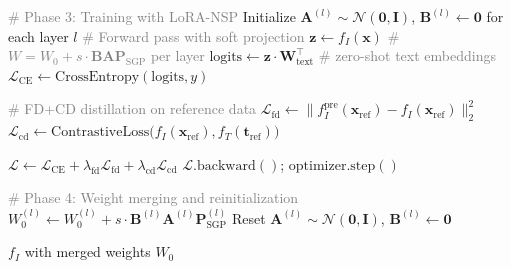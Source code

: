 \documentclass{article}
\begin{document}
\begin{algorithm}[h]
\begin{algorithmic}[1]
    \State \textcolor{gray}{\# Phase 3: Training with LoRA-NSP}
    \State Initialize $\mathbf{A}^{(l)} \sim \mathcal{N}(\mathbf{0}, \mathbf{I})$, $\mathbf{B}^{(l)} \leftarrow \mathbf{0}$ for each layer $l$
            \State \textcolor{gray}{\# Forward pass with soft projection}
            \State $\mathbf{z} \leftarrow f_I(\mathbf{x})$ \textcolor{gray}{\# $W = W_0 + s \cdot \mathbf{B} \mathbf{A} \mathbf{P}_{\text{SGP}}$ per layer}
            \State $\text{logits} \leftarrow \mathbf{z} \cdot \mathbf{W}_{\text{text}}^\top$ \textcolor{gray}{\# zero-shot text embeddings}
            \State $\mathcal{L}_{\text{CE}} \leftarrow \text{CrossEntropy}(\text{logits}, y)$
            
            \State \textcolor{gray}{\# FD+CD distillation on reference data}
            \State $\mathcal{L}_{\text{fd}} \leftarrow \|f_I^{\text{pre}}(\mathbf{x}_{\text{ref}}) - f_I(\mathbf{x}_{\text{ref}})\|_2^2$
            \State $\mathcal{L}_{\text{cd}} \leftarrow \text{ContrastiveLoss}\big(f_I(\mathbf{x}_{\text{ref}}), f_T(\mathbf{t}_{\text{ref}})\big)$
            
            \State $\mathcal{L} \leftarrow \mathcal{L}_{\text{CE}} + \lambda_{\text{fd}} \mathcal{L}_{\text{fd}} + \lambda_{\text{cd}} \mathcal{L}_{\text{cd}}$
            \State $\mathcal{L}.\text{backward}()$; $\text{optimizer}.\text{step}()$
        \EndFor
    \EndFor

    \State \textcolor{gray}{\# Phase 4: Weight merging and reinitialization}
        \State $W_0^{(l)} \leftarrow W_0^{(l)} + s \cdot \mathbf{B}^{(l)} \mathbf{A}^{(l)} \mathbf{P}_{\text{SGP}}^{(l)}$
        \State Reset $\mathbf{A}^{(l)} \sim \mathcal{N}(\mathbf{0}, \mathbf{I})$, $\mathbf{B}^{(l)} \leftarrow \mathbf{0}$
    \EndFor
\EndFor

\State \Return $f_I$ with merged weights $W_0$
\end{algorithmic}
\end{algorithm}
\end{document}
